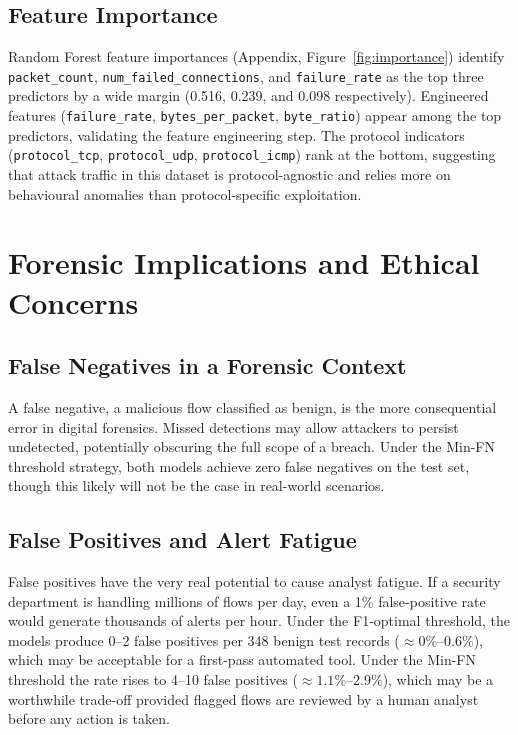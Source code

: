 \documentclass[11pt]{article}
\begin{document}
\subsection{Feature Importance}

Random Forest feature importances (Appendix, Figure~\ref{fig:importance})
identify \texttt{packet\_count}, \texttt{num\_failed\_connections}, and
\texttt{failure\_rate} as the top three predictors by a wide margin (0.516,
0.239, and 0.098 respectively). Engineered features (\texttt{failure\_rate},
\texttt{bytes\_per\_packet}, \texttt{byte\_ratio}) appear among the top
predictors, validating the feature engineering step. The protocol indicators
(\texttt{protocol\_tcp}, \texttt{protocol\_udp}, \texttt{protocol\_icmp})
rank at the bottom, suggesting that attack traffic in this dataset is
protocol-agnostic and relies more on behavioural anomalies than
protocol-specific exploitation.


\section{Forensic Implications and Ethical Concerns}
\label{sec:forensics}

\subsection{False Negatives in a Forensic Context}

A false negative, a malicious flow classified as benign, is the more
consequential error in digital forensics. Missed detections may
allow attackers to persist undetected, potentially obscuring the full scope
of a breach. Under the Min-FN
threshold strategy, both models achieve zero false negatives on the test set,
though this likely will not be the case in real-world scenarios.

\subsection{False Positives and Alert Fatigue}

False positives have the very real potential to cause analyst fatigue. If a security department is
handling millions of flows per day, even a 1\% false-positive rate would
generate thousands of alerts per hour. Under the F1-optimal threshold, the models produce 0--2 false positives per
348 benign test records ($\approx 0\%$--$0.6\%$), which may be acceptable for
a first-pass automated tool. Under the Min-FN threshold the rate
rises to 4--10 false positives ($\approx 1.1\%$--$2.9\%$), which may be a worthwhile
trade-off provided flagged flows are reviewed by a human analyst before any
action is taken.
\end{document}
